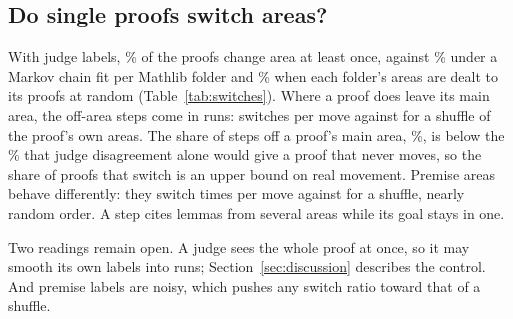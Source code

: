 \subsection{Do single proofs switch areas?}
\label{sec:switches}
With judge labels, \resSwitchJudgeHas\% of the \resSwitchJudgeProofs{}
proofs change area at least once, against \resSwitchJudgeHasMarkov\% under a
Markov chain fit per Mathlib folder and \resSwitchJudgeHasPooled\% when
each folder's areas are dealt to its proofs at random
(Table~\ref{tab:switches}). Where a proof does leave its main area, the
off-area steps come in runs: \resSwitchJudgeRate{} switches per move against
\resSwitchJudgeRateShuffle{} for a shuffle of the proof's own areas. The
share of steps off a proof's main area, \resSwitchJudgeOffMode\%, is below
the \resSwitchJudgeOffModeNoise\% that judge disagreement alone would give a
proof that never moves, so the share of proofs that switch is an upper bound
on real movement. Premise areas behave differently:
they switch \resSwitchPremiseRate{} times per move against
\resSwitchPremiseRateShuffle{} for a shuffle, nearly random order. A step
cites lemmas from several areas while its goal stays in one.

Two readings remain open. A judge sees the whole proof at once, so it may
smooth its own labels into runs; Section~\ref{sec:discussion} describes the
control. And premise labels are noisy, which pushes any switch ratio toward
that of a shuffle.

